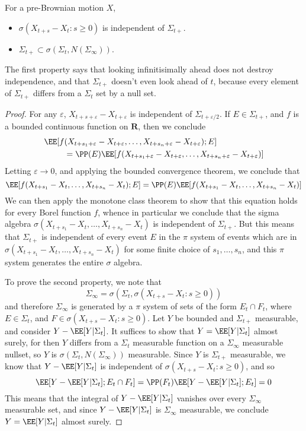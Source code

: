 \begin{theorem}
    For a pre-Brownian motion $X$,
    \begin{itemize}
        \item $\sigma(X_{t + s} - X_t: s \geq 0)$ is independent of $\Sigma_{t+}$.
        \item $\Sigma_{t+} \subset \sigma(\Sigma_t, N(\Sigma_\infty))$.
    \end{itemize}
    The first property says that looking infinitisimally ahead does not destroy independence, and that $\Sigma_{t+}$ doesn't even look ahead of $t$, because every element of $\Sigma_{t+}$ differs from a $\Sigma_t$ set by a null set.
\end{theorem}
\begin{proof}
    For any $\varepsilon$, $X_{t+s+\varepsilon} - X_{t+\varepsilon}$ is independent of $\Sigma_{t + \varepsilon/2}$. If $E \in \Sigma_{t+}$, and $f$ is a bounded continuous function on $\mathbf{R}$, then we conclude
    \begin{align*}
        \EE[f&(X_{t+s_1+\varepsilon} - X_{t+\varepsilon}, \dots, X_{t+s_n+\varepsilon} - X_{t+\varepsilon});E]\\
        &= \PP(E) \EE[f(X_{t+s_1+\varepsilon} - X_{t+\varepsilon}, \dots, X_{t+s_n+\varepsilon} - X_{t+\varepsilon})]
    \end{align*}
    Letting $\varepsilon \to 0$, and applying the bounded convergence theorem, we conclude that
    \[ \EE[f(X_{t+s_1} - X_t, \dots, X_{t+s_n} - X_t);E] = \PP(E) \EE[f(X_{t + s_1} - X_t, \dots, X_{t+s_n} - X_t)] \]
    We can then apply the monotone class theorem to show that this equation holds for every Borel function $f$, whence in particular we conclude that the sigma algebra $\sigma(X_{t+s_1} - X_t, \dots, X_{t+s_n} - X_t)$ is independent of $\Sigma_{t+}$. But this means that $\Sigma_{t+}$ is independent of every event $E$ in the $\pi$ system of events which are in $\sigma(X_{t+s_1} - X_t, \dots, X_{t+s_n} - X_t)$ for some finite choice of $s_1, \dots, s_n$, and this $\pi$ system generates the entire $\sigma$ algebra.

    To prove the second property, we note that
    \[ \Sigma_\infty = \sigma(\Sigma_t, \sigma(X_{t+s} - X_t: s \geq 0)) \]
    and therefore $\Sigma_\infty$ is generated by a $\pi$ system of sets of the form $E_t \cap F_t$, where $E \in \Sigma_t$, and $F \in \sigma(X_{t+s} - X_t: s \geq 0)$. Let $Y$ be bounded and $\Sigma_{t+}$ measurable, and consider $Y - \EE[Y|\Sigma_t]$. It suffices to show that $Y = \EE[Y|\Sigma_t]$ almost surely, for then $Y$ differs from a $\Sigma_t$ measurable function on a $\Sigma_\infty$ measurable nullset, so $Y$ is $\sigma(\Sigma_t, N(\Sigma_\infty))$ measurable. Since $Y$ is $\Sigma_{t+}$ measurable, we know that $Y - \EE[Y|\Sigma_t]$ is independent of $\sigma(X_{t+s} - X_t: s \geq 0)$, and so
    \[ \EE[Y - \EE[Y|\Sigma_t];E_t \cap F_t] = \PP(F_t) \EE[Y - \EE[Y|\Sigma_t];E_t] = 0 \]
    This means that the integral of $Y - \EE[Y|\Sigma_t]$ vanishes over every $\Sigma_\infty$ measurable set, and since $Y - \EE[Y|\Sigma_t]$ is $\Sigma_\infty$ measurable, we conclude $Y = \EE[Y|\Sigma_t]$ almost surely.
\end{proof}


